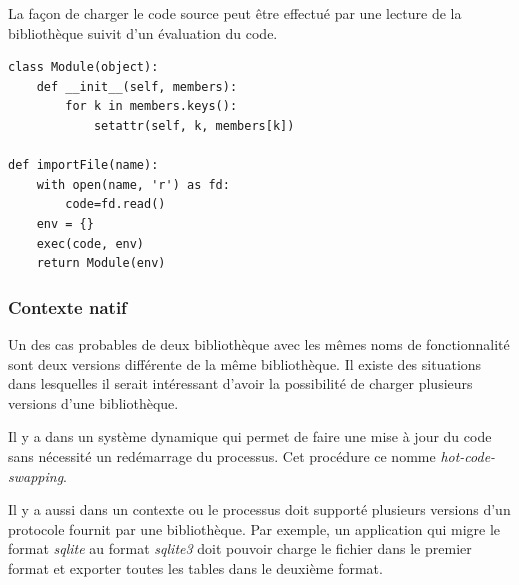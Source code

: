 La façon de charger le code source peut être effectué par une lecture de la
bibliothèque suivit d'un évaluation du code.

\begin{verbatim}
class Module(object):
    def __init__(self, members):
        for k in members.keys():
            setattr(self, k, members[k])

def importFile(name):
    with open(name, 'r') as fd:
        code=fd.read()
    env = {}
    exec(code, env)
    return Module(env)

\end{verbatim}

\subsubsection{Contexte natif}

Un des cas probables de deux bibliothèque avec les mêmes noms de fonctionnalité
sont deux versions différente de la même bibliothèque. Il existe des situations
dans lesquelles il serait intéressant d'avoir la possibilité de charger plusieurs
versions d'une bibliothèque.

Il y a dans un système dynamique qui permet de faire une mise à jour du
code sans nécessité un redémarrage du processus. Cet procédure ce nomme
\textit{hot-code-swapping}.

Il y a aussi dans un contexte ou le processus doit supporté plusieurs versions
d'un protocole fournit par une bibliothèque. Par exemple, un application qui migre
le format \textit{sqlite} au format \textit{sqlite3} doit pouvoir charge le fichier
dans le premier format et exporter toutes les tables dans le deuxième format.

